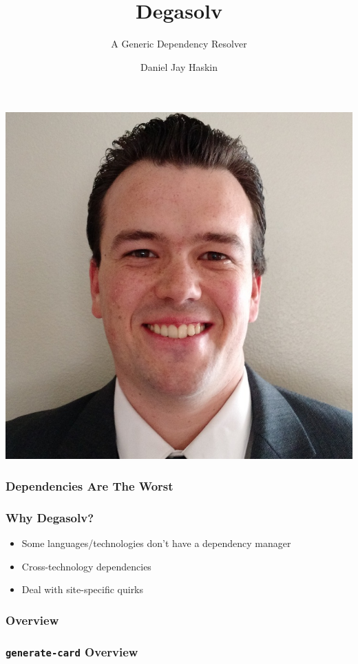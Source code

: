\documentclass{beamer}
\title{Degasolv}
\subtitle{A Generic Dependency Resolver}
\author{Daniel Jay Haskin}
\begin{document}
  \begin{frame}
    \titlepage
  \end{frame}
  \begin{frame}
      \centerline{\includegraphics[scale=0.15]{DanielHaskin-small.jpg}}
  \end{frame}
  \begin{frame}
      \frametitle{Dependencies Are The Worst}

  \end{frame}
  \begin{frame}
      \frametitle{Why Degasolv?}
      \begin{itemize}
          \item Some languages/technologies don't have a dependency manager
              \pause
          \item Cross-technology dependencies
              \pause
          \item Deal with site-specific quirks
      \end{itemize}
  \end{frame}
  \begin{frame}
      \frametitle{Overview}
  \end{frame}
  \begin{frame}
      \frametitle{\texttt{generate-card} Overview}
  \end{frame}
\end{document}
